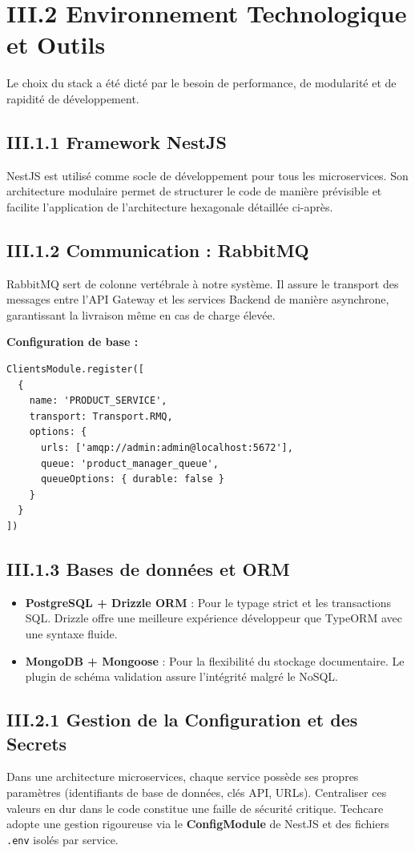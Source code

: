 \section{III.2 Environnement Technologique et Outils}
\label{sec:tools}

Le choix du stack a été dicté par le besoin de performance, de modularité et de rapidité de développement.

\subsection{III.1.1 Framework NestJS}
NestJS est utilisé comme socle de développement pour tous les microservices. Son architecture modulaire permet de structurer le code de manière prévisible et facilite l'application de l'architecture hexagonale détaillée ci-après.

\subsection{III.1.2 Communication : RabbitMQ}
RabbitMQ sert de colonne vertébrale à notre système. Il assure le transport des messages entre l'API Gateway et les services Backend de manière asynchrone, garantissant la livraison même en cas de charge élevée.

\textbf{Configuration de base :}
\begin{verbatim}
ClientsModule.register([
  {
    name: 'PRODUCT_SERVICE',
    transport: Transport.RMQ,
    options: {
      urls: ['amqp://admin:admin@localhost:5672'],
      queue: 'product_manager_queue',
      queueOptions: { durable: false }
    }
  }
])
\end{verbatim}

\subsection{III.1.3 Bases de données et ORM}
\begin{itemize}
    \item \textbf{PostgreSQL + Drizzle ORM} : Pour le typage strict et les transactions SQL. Drizzle offre une meilleure expérience développeur que TypeORM avec une syntaxe fluide.
    \item \textbf{MongoDB + Mongoose} : Pour la flexibilité du stockage documentaire. Le plugin de schéma validation assure l'intégrité malgré le NoSQL.
\end{itemize}

\subsection{III.2.1 Gestion de la Configuration et des Secrets}
Dans une architecture microservices, chaque service poss\`ede ses propres param\`etres (identifiants de base de donn\'ees, cl\'es API, URLs). Centraliser ces valeurs en dur dans le code constitue une faille de s\'ecurit\'e critique. Techcare adopte une gestion rigoureuse via le \textbf{ConfigModule} de NestJS et des fichiers \texttt{.env} isol\'es par service.

